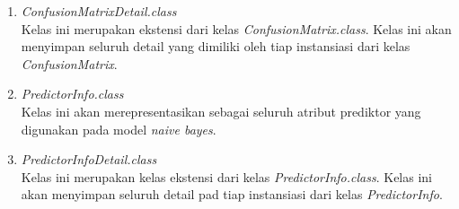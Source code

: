 \begin{enumerate}
\item{\textit{ConfusionMatrixDetail.class}} \\
Kelas ini merupakan ekstensi dari kelas \textit{ConfusionMatrix.class}. Kelas ini akan menyimpan seluruh detail yang dimiliki oleh tiap instansiasi dari kelas \textit{ConfusionMatrix}.
\item{\textit{PredictorInfo.class}} \\
Kelas ini akan merepresentasikan sebagai seluruh atribut prediktor yang digunakan pada model \textit{naive bayes}.
\item{\textit{PredictorInfoDetail.class}} \\
Kelas ini merupakan kelas ekstensi dari kelas \textit{PredictorInfo.class}. Kelas ini akan menyimpan seluruh detail pad tiap instansiasi dari kelas \textit{PredictorInfo}.
\end{enumerate}
